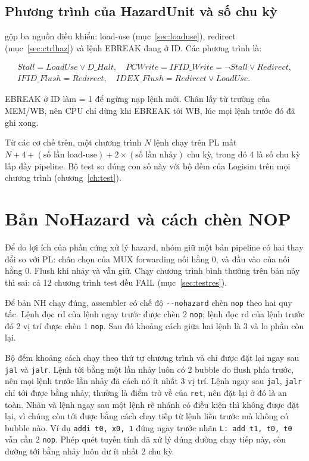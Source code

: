 \documentclass[../report.tex]{subfiles}
\begin{document}
\subsection{Phương trình của HazardUnit và số chu kỳ}\label{sec:hzeq}

 gộp ba nguồn điều khiển: load-use (mục~\ref{sec:loaduse}), redirect (mục~\ref{sec:ctrlhaz}) và
lệnh EBREAK đang ở ID. Các phương trình là:

\begin{gather*}
\mathit{Stall} = \mathit{LoadUse} \lor \mathit{D\_Halt},\quad
\mathit{PCWrite} = \mathit{IFID\_Write} = \lnot\mathit{Stall} \lor \mathit{Redirect}, \\
\mathit{IFID\_Flush} = \mathit{Redirect},\quad \mathit{IDEX\_Flush} = \mathit{Redirect} \lor \mathit{LoadUse}.
\end{gather*}

EBREAK ở ID làm  = 1 để ngừng nạp lệnh mới. Chân  lấy từ trường  của MEM/WB, nên
CPU chỉ dừng khi EBREAK tới WB, lúc mọi lệnh trước đó đã ghi xong.

Từ các cơ chế trên, một chương trình $N$ lệnh chạy trên PL mất
$N + 4 + (\text{số lần load-use}) + 2 \times (\text{số lần nhảy})$ chu kỳ, trong đó 4 là số chu kỳ lấp đầy pipeline.
Bộ test so đúng con số này với bộ đếm  của Logisim trên mọi chương trình (chương~\ref{ch:test}).

\section{Bản NoHazard và cách chèn NOP}\label{sec:nh}

Để đo lợi ích của phần cứng xử lý hazard, nhóm giữ một bản pipeline có hai thay đổi so với PL: chân chọn của MUX
forwarding nối hằng 0, và đầu vào  của  nối hằng 0. Flush khi nhảy và
 vẫn giữ. Chạy chương trình bình thường trên bản này thì sai: cả 12 chương trình test đều FAIL
(mục~\ref{sec:testres}).

Để bản NH chạy đúng, assembler có chế độ \texttt{-{}-nohazard} chèn \texttt{nop} theo hai quy tắc. Lệnh đọc rd của
lệnh ngay trước được chèn 2 \texttt{nop}; lệnh đọc rd của lệnh trước đó 2 vị trí được chèn 1 \texttt{nop}. Sau đó
khoảng cách giữa hai lệnh là 3 và  lo phần còn lại.

Bộ đếm khoảng cách chạy theo thứ tự chương trình và chỉ được đặt lại ngay sau \texttt{jal} và \texttt{jalr}. Lệnh
tới bằng một lần nhảy luôn có 2 bubble do flush phía trước, nên mọi lệnh trước lần nhảy đã cách nó ít nhất 3 vị
trí. Lệnh ngay sau \texttt{jal}, \texttt{jalr} chỉ tới được bằng nhảy, thường là điểm trở về của \texttt{ret}, nên
đặt lại ở đó là an toàn. Nhãn và lệnh ngay sau một lệnh rẽ nhánh có điều kiện thì không được đặt lại, vì chúng còn
tới được bằng cách chạy tiếp từ lệnh liền trước mà không có bubble nào. Ví dụ \texttt{addi t0, x0, 1} đứng ngay
trước nhãn \texttt{L: add t1, t0, t0} vẫn cần 2 \texttt{nop}. Phép quét tuyến tính đã xử lý đúng đường chạy tiếp
này, còn đường tới bằng nhảy luôn dư ít nhất 2 chu kỳ.
\end{document}
